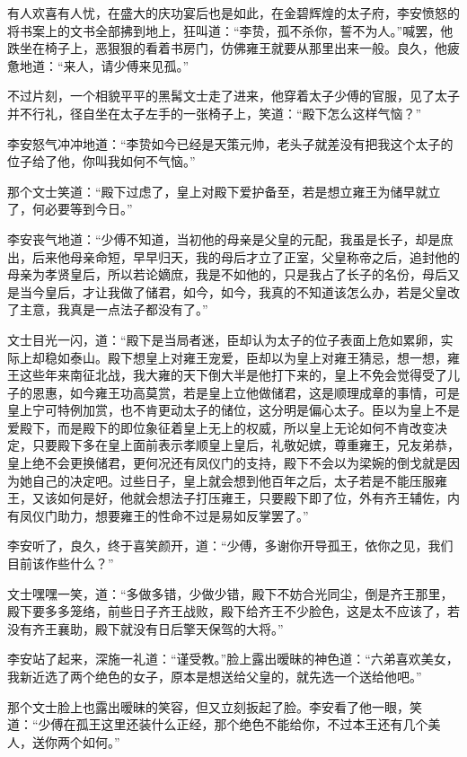 有人欢喜有人忧，在盛大的庆功宴后也是如此，在金碧辉煌的太子府，李安愤怒的将书案上的文书全部拂到地上，狂叫道：“李贽，孤不杀你，誓不为人。”喊罢，他跌坐在椅子上，恶狠狠的看着书房门，仿佛雍王就要从那里出来一般。良久，他疲惫地道：“来人，请少傅来见孤。”

不过片刻，一个相貌平平的黑髯文士走了进来，他穿着太子少傅的官服，见了太子并不行礼，径自坐在太子左手的一张椅子上，笑道：“殿下怎么这样气恼？”

李安怒气冲冲地道：“李贽如今已经是天策元帅，老头子就差没有把我这个太子的位子给了他，你叫我如何不气恼。”

那个文士笑道：“殿下过虑了，皇上对殿下爱护备至，若是想立雍王为储早就立了，何必要等到今日。”

李安丧气地道：“少傅不知道，当初他的母亲是父皇的元配，我虽是长子，却是庶出，后来他母亲命短，早早归天，我的母后才立了正室，父皇称帝之后，追封他的母亲为孝贤皇后，所以若论嫡庶，我是不如他的，只是我占了长子的名份，母后又是当今皇后，才让我做了储君，如今，如今，我真的不知道该怎么办，若是父皇改了主意，我真是一点法子都没有了。”

文士目光一闪，道：“殿下是当局者迷，臣却认为太子的位子表面上危如累卵，实际上却稳如泰山。殿下想皇上对雍王宠爱，臣却以为皇上对雍王猜忌，想一想，雍王这些年来南征北战，我大雍的天下倒大半是他打下来的，皇上不免会觉得受了儿子的恩惠，如今雍王功高莫赏，若是皇上立他做储君，这是顺理成章的事情，可是皇上宁可特例加赏，也不肯更动太子的储位，这分明是偏心太子。臣以为皇上不是爱殿下，而是殿下的即位象征着皇上无上的权威，所以皇上无论如何不肯改变决定，只要殿下多在皇上面前表示孝顺皇上皇后，礼敬妃嫔，尊重雍王，兄友弟恭，皇上绝不会更换储君，更何况还有凤仪门的支持，殿下不会以为梁婉的倒戈就是因为她自己的决定吧。过些日子，皇上就会想到他百年之后，太子若是不能压服雍王，又该如何是好，他就会想法子打压雍王，只要殿下即了位，外有齐王辅佐，内有凤仪门助力，想要雍王的性命不过是易如反掌罢了。”

李安听了，良久，终于喜笑颜开，道：“少傅，多谢你开导孤王，依你之见，我们目前该作些什么？”

文士嘿嘿一笑，道：“多做多错，少做少错，殿下不妨合光同尘，倒是齐王那里，殿下要多多笼络，前些日子齐王战败，殿下给齐王不少脸色，这是太不应该了，若没有齐王襄助，殿下就没有日后擎天保驾的大将。”

李安站了起来，深施一礼道：“谨受教。”脸上露出暧昧的神色道：“六弟喜欢美女，我新近选了两个绝色的女子，原本是想送给父皇的，就先选一个送给他吧。”

那个文士脸上也露出暧昧的笑容，但又立刻扳起了脸。李安看了他一眼，笑道：“少傅在孤王这里还装什么正经，那个绝色不能给你，不过本王还有几个美人，送你两个如何。”

